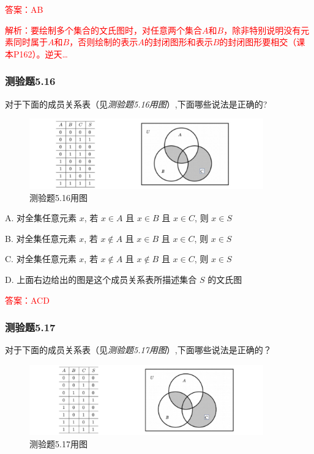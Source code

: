 \documentclass[UTF8, heading=true]{ctexart}
\begin{document}
\textcolor{red}{答案：AB}

\textcolor{red}{解析：要绘制多个集合的文氏图时，对任意两个集合$A$和$B$，除非特别说明没有元素同时属于$A$和$B$，否则绘制的表示$A$的封闭图形和表示$B$的封闭图形要相交（课本P162）。逆天\dots}




\subsubsection{测验题5.16}

对于下面的成员关系表（见\textit{测验题5.16用图}）,下面哪些说法是正确的?

\begin{figure}[htbp]
  \centering
  \includegraphics[width=0.9\textwidth]{5.16.jpg} %
  \caption{测验题5.16用图}
\end{figure}


A. 对全集任意元素 $x$, 若 $x \in A$ 且 $x \in B$ 且 $x \in C$, 则 $x \in S$

B. 对全集任意元素 $x$, 若 $x \notin A$ 且 $x \in B$ 且 $x \in C$, 则 $x \in S$

C. 对全集任意元素 $x$, 若 $x \notin A$ 且 $x \notin B$ 且 $x \in C$, 则 $x \in S$

D. 上面右边给出的图是这个成员关系表所描述集合 $S$ 的文氏图

\textcolor{red}{答案：ACD}

\subsubsection{测验题5.17}
对于下面的成员关系表（见\textit{测验题5.17用图}）,下面哪些说法是正确的？

\begin{figure}[htbp]
  \centering
  \includegraphics[width=0.9\textwidth]{5.17.jpg} %
  \caption{测验题5.17用图}
\end{figure}
\end{document}
